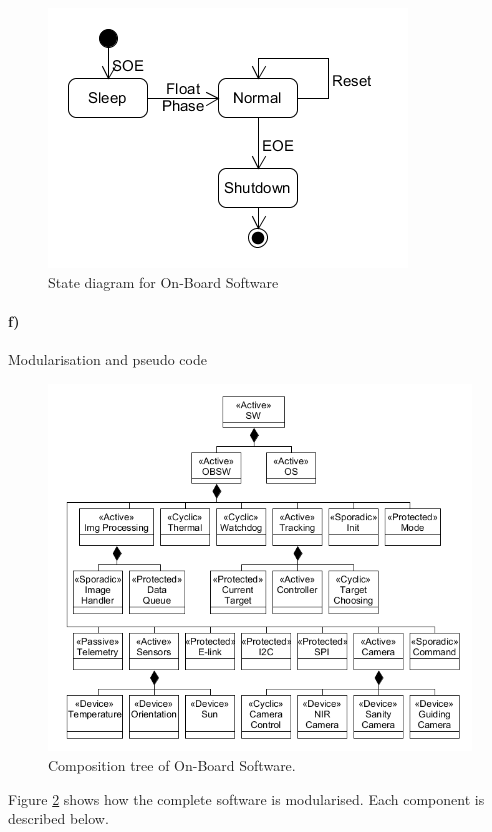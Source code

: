 \begin{figure}[H]
	\centering
	\includegraphics[width=.55\textwidth]{4-experiment-design/img/software/state-diagram.png}
	\caption{State diagram for On-Board Software}
	\label{fig:software-state-diagram}
\end{figure}

\paragraph{f)} Modularisation and pseudo code\\

\begin{figure}[H]
	\centering
	\includegraphics[width=\textwidth]{4-experiment-design/img/software/composition-tree.png}
	\caption{Composition tree of On-Board Software.}
	\label{fig:software-composition-tree}
\end{figure}

Figure \ref{fig:software-composition-tree} shows how the complete software is modularised. Each component is described below.

